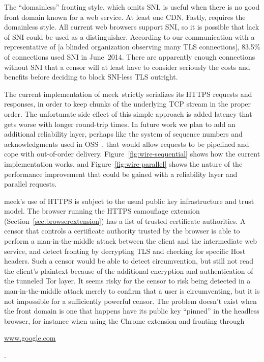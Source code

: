 \documentclass[conference]{IEEEtran}
\newcommand{\meek}{meek\xspace}
\def\urll#1{\begin{NoHyper}\url{#1}\end{NoHyper}}
\begin{document}
The ``domainless'' fronting style, which omits SNI,
is useful when there is no good front domain known for a web service.
At least one CDN, Fastly, requires the domainless style.
All current web browsers support SNI,
so it is possible that lack of SNI could be used as a distinguisher.
According to our communication with
a representative of
[a blinded organization observing many TLS connections],
83.5\% of connections used SNI in June~2014.
There are apparently enough connections without SNI
that a censor will at least have to consider seriously
the costs and benefits before deciding to block SNI-less TLS outright.

The current implementation of \meek\ strictly serializes
its HTTPS requests and responses,
in order to keep chunks of the underlying TCP stream
in the proper order.
The unfortunate side effect of this simple approach
is added latency that gets worse with longer round-trip times.
In future work we plan to add an additional reliability layer,
perhaps like the system of sequence numbers and acknowledgments used in OSS~\cite{oss},
that would allow requests to be pipelined
and cope with out-of-order delivery.
Figure~\ref{fig:wire-sequential} shows how the current implementation works,
and Figure~\ref{fig:wire-parallel} shows the nature of the performance
improvement that could be gained with a reliability layer
and parallel requests.

\meek's use of HTTPS is subject to the usual public key infrastructure
and trust model.
The browser running the HTTPS camouflage extension (Section~\ref{sec:browserextension})
has a list of trusted certificate authorities.
A censor that controls a certificate authority trusted by the browser
is able to perform a man-in-the-middle attack
between the client and the intermediate web service,
and detect fronting by decrypting TLS and checking for specific Host headers.
Such a censor would be able to detect circumvention,
but still not read the client's plaintext because of the
additional encryption and authentication of the tunneled Tor layer.
It seems risky for the censor to risk being detected in
a man-in-the-middle attack merely to confirm that a user is circumventing,
but it is not impossible for a sufficiently powerful censor.
The problem doesn't exist when the front domain is one
that happens have its public key ``pinned'' in the headless browser,
for instance when using the Chrome extension and fronting through
\urll{www.google.com}.
\end{document}
